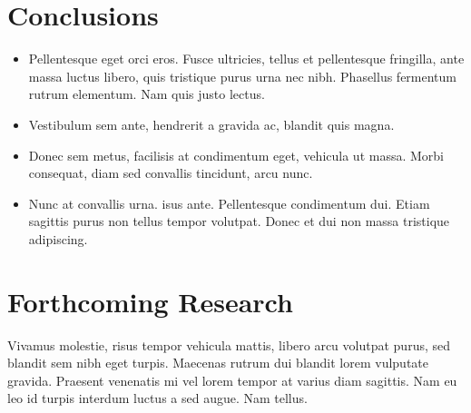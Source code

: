 \documentclass[a0,portrait]{a0poster}
\begin{document}
\begin{multicols}{2}

\color{DarkRed} %

\section*{Conclusions}

\begin{itemize}
\item Pellentesque eget orci eros. Fusce ultricies, tellus et pellentesque fringilla, ante massa luctus libero, quis tristique purus urna nec nibh. Phasellus fermentum rutrum elementum. Nam quis justo lectus.
\item Vestibulum sem ante, hendrerit a gravida ac, blandit quis magna.
\item Donec sem metus, facilisis at condimentum eget, vehicula ut massa. Morbi consequat, diam sed convallis tincidunt, arcu nunc.
\item Nunc at convallis urna. isus ante. Pellentesque condimentum dui. Etiam sagittis purus non tellus tempor volutpat. Donec et dui non massa tristique adipiscing.
\end{itemize}

\color{DarkSlateGray} %


\section*{Forthcoming Research}

Vivamus molestie, risus tempor vehicula mattis, libero arcu volutpat purus, sed blandit sem nibh eget turpis. Maecenas rutrum dui blandit lorem vulputate gravida. Praesent venenatis mi vel lorem tempor at varius diam sagittis. Nam eu leo id turpis interdum luctus a sed augue. Nam tellus.



\end{multicols}
\end{document}
